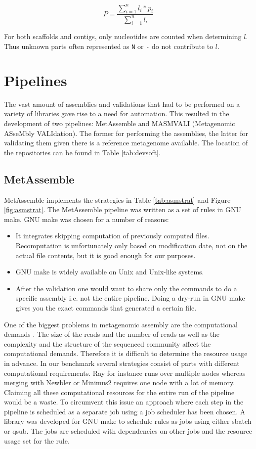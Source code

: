 \documentclass[a4paper,12pt]{report}
\begin{document}
\begin{equation}
P = \frac{\sum_{i=1}^n l_{i} * p_{i}}{\sum_{i=1}^{n} l_{i}}
\end{equation}

For both scaffolds and contigs, only nucleotides are counted when determining
$l$. Thus unknown parts often represented as \verb!N! or \verb!-! do not
contribute to $l$.\\


\section{Pipelines} The vast amount of assemblies and validations that had to
be performed on a variety of libraries gave rise to a need for automation. This
resulted in the development of two pipelines: MetAssemble and MASMVALI
(Metagenomic ASseMbly VALIdation). The former for performing the assemblies,
the latter for validating them given there is a reference metagenome available.
The location of the repositories can be found in Table \ref{tab:devsoft}.

\subsection{MetAssemble}
MetAssemble implements the strategies in Table \ref{tab:asmstrat} and Figure
\ref{fig:asmstrat}. The MetAssemble pipeline was written as a set of rules in
GNU make. GNU make was chosen for a number of reasons:
\begin{itemize}
\item It integrates skipping computation of previously computed files.
    Recomputation is unfortunately only based on modification date, not on the
    actual file contents, but it is good enough for our purposes.
\item GNU make is widely available on Unix and Unix-like systems.
\item After the validation one would want to share only the commands to do a
    specific assembly i.e. not the entire pipeline. Doing a dry-run in GNU make
    gives you the exact commands that generated a certain file.
\end{itemize}
One of the biggest problems in metagenomic assembly are the
computational demands \cite{Zhang21423806}. The size of the reads
and the number of reads as well as the complexity and the structure of the
sequenced community affect the computational demands. Therefore it is difficult
to determine the resource usage in advance. In our benchmark several strategies
consist of parts with different computational requirements. Ray for instance
runs over multiple nodes whereas merging with Newbler or Minimus2
requires one node with a lot of memory. Claiming all these computational
resources for the entire run of the pipeline would be a waste. To circumvent
this issue an approach where each step in the pipeline is scheduled as a
separate job using a job scheduler has been chosen. A library was developed for
GNU make to schedule rules as jobs using either sbatch or qsub. The jobs are
scheduled with dependencies on other jobs and the resource usage set for the
rule. 
\end{document}
